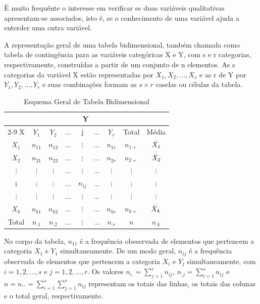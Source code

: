 È muito frequênte o interesse em verificar se duas variáveis qualitativas apresentam-se associados, isto é, se o conhecimento de uma variável ajuda a enterder uma outra variável.\vskip0.3cm

A representação geral de uma tabela bidimensional, também chamada como tabela de contingência para as variáveis categóricas X e Y, com s e r categorias, respectivamente, construídas a partir de um conjunto de n elementos. As s categorias da variável X estão representadas por $X_{1},X_{2},\ldots,X_{s}$ e as r de Y por $Y_{1},Y_{2},\ldots,Y_{r}$ e suas combinações formam as $s \times r$ caselas ou células da tabela.


\begin{table}[H]
    \centering
    {
    \caption{Esquema Geral de Tabela Bidimensional}
    \label{Bidimensional}
    \vspace{0.2cm}
\begin{tabular}{c|c|c|c|c|c|c|c|c}
  \hline\hline
                  &  \multicolumn{7}{c}{Y} \\
\cline{2-9}
  X               & $Y_{1}$     & $Y_{2}$     & $\ldots$  & j        & $\ldots$  & $Y_{r}$  & Total    &  Média \\
  \hline
  $X_{1}$         & $ n_{11}$   & $ n_{12}$   & $\ldots$  & $\vdots$ & $\ldots$  & $n_{1r}$ & $n_{1+}$ & $\Bar{X}_{1}$\\
  $X_{2}$         & $ n_{21}$   & $ n_{22}$   & $\ldots$  & $\vdots$ & $\ldots$  & $n_{2r}$ & $n_{2+}$ & $\Bar{X}_{2}$\\
  $\vdots$        & $\vdots$    & $\vdots$    & $\ldots$  & $\vdots$ & $\ldots$  & $\vdots$ & $\vdots$ & $\vdots$\\
  i               & $\vdots$    & $\vdots$    & $\ldots$  & $n_{ij}$ & $\ldots$  & $\vdots$ & $\vdots$ & $\vdots$  \\
  $\vdots$        & $\vdots$    & $\vdots$    & $\ldots$  & $\vdots$ & $\ldots$  & $\vdots$ & $\vdots$ &  $\vdots$\\
  $X_{k}$         & $ n_{k1}$   & $ n_{k2}$   & $\ldots$  & $\vdots$ & $\ldots$  & $n_{kr}$ & $n_{k+}$ & $\Bar{X}_{k}$ \\
  \hline\hline
  Total              & $n_{.1}$    & $n_{.2}$    & $\ldots$  & $\vdots$ & $\ldots$  & $n_{.r}$ & $n$      &  $n_{.k}$ \\
   \hline\hline
\end{tabular}}
\end{table}

No corpo da tabela, $n_{11}$ é a frequência obeservada de elementos que pertencem a categoria $X_{1}$ e $Y_{1}$ simultaneamente. De um modo geral, $n_{ij}$ é a frequência observada de elementos que pertencem a categoria $X_{i}$ e $Y_{j}$ simultaneamente, com $i=1,2, \ldots,s $ e $j=1,2, \ldots ,r $. Os valores $n_{i.}=\sum_{j=1}^{r}n_{ij}$,
$n_{.j}=\sum_{i=1}^{s}n_{ij}$ e $n=n..=\sum_{i=1}^{s}\sum_{j=1}^{r}n_{ij}$ representam os totais das linhas, os totais das colunas e o total geral, respectivamente.


